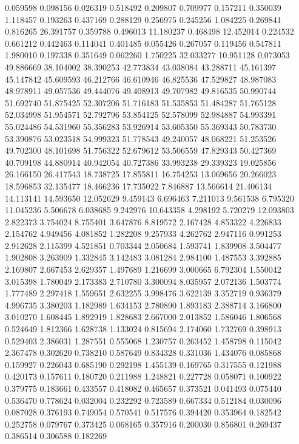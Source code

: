 0.059598
0.098156
0.026319
0.518492
0.209807
0.709977
0.157211
0.350039
1.118457
0.193263
0.437169
0.288129
0.256975
0.245256
1.084225
0.269841
0.816265
26.391757
0.359788
0.496013
11.180237
0.468498
12.452014
0.224532
0.661212
0.442463
0.114041
0.401485
0.055426
0.267057
0.119456
0.547811
1.980010
0.197338
0.351649
0.062260
1.750225
32.033277
10.951128
0.073053
49.886669
38.104002
38.390253
42.773834
43.038084
43.288711
45.161397
45.147842
45.609593
46.212766
46.610946
46.825536
47.529827
48.987083
48.978911
49.057536
49.444076
49.408913
49.707982
49.816535
50.990744
51.692740
51.875425
52.307206
51.716183
51.535853
51.484287
51.765128
52.034998
51.954571
52.792796
53.854125
52.578099
52.984887
54.993391
55.024486
54.531960
55.356283
53.926914
53.605350
55.369343
50.783730
53.390876
53.023518
54.999323
51.778543
49.240057
48.068221
51.253526
49.702300
48.101698
51.756322
52.679612
53.506559
47.829343
50.427369
40.709198
44.880914
40.942054
40.727386
33.993238
29.339323
19.025856
26.166150
26.417543
18.738725
17.855811
16.754253
13.069656
20.266023
18.596853
32.135477
18.466236
17.735022
7.846887
13.566614
21.406134
14.113141
14.593650
12.052629
9.459143
6.696463
7.211013
9.561538
6.795320
11.045236
5.506678
6.038685
9.242976
10.643358
4.298192
5.720279
12.093803
2.822373
3.754024
8.755401
3.647876
8.819572
2.167428
4.853322
4.226833
2.154762
4.949456
4.081852
1.282208
9.257933
4.262762
2.947116
0.991253
2.912628
2.115399
4.521851
0.703344
2.050684
1.593741
1.839908
3.504477
1.902808
3.263909
1.332845
3.142483
3.081284
2.984100
1.487553
3.392885
2.169807
2.667453
2.629357
1.497689
1.216699
3.000665
6.792304
1.550042
3.015398
1.780049
2.173383
2.710780
3.300094
8.035957
2.072136
1.503774
1.777489
2.297418
1.559651
2.632255
3.998476
3.622139
3.352719
0.936379
4.996735
3.380203
1.182989
1.634153
2.780890
1.893183
2.388714
3.166800
3.010270
1.608445
1.892919
1.828683
2.667000
2.013852
1.586046
1.806568
0.524649
1.812366
1.628738
1.133024
0.815694
2.174060
1.732769
0.398913
0.529403
2.386031
1.287551
0.555068
1.230757
0.263452
1.458798
0.115042
2.367478
0.302620
0.738210
0.587649
0.834328
0.331036
1.434076
0.085868
0.159927
0.226043
0.685190
0.292198
1.455139
0.169765
0.317555
0.121988
0.420173
0.157611
0.180720
0.211988
1.248821
0.227728
0.058071
0.100922
0.379775
0.183661
0.433557
0.418082
0.465657
0.373521
0.041493
0.075440
0.536470
0.778624
0.032004
0.232292
0.723589
0.667334
0.512184
0.030096
0.087028
0.376193
0.749054
0.570541
0.517576
0.394420
0.353964
0.182542
0.252758
0.079767
0.373425
0.068165
0.357916
0.200030
0.856801
0.269437
0.386514
0.306588
0.182269

